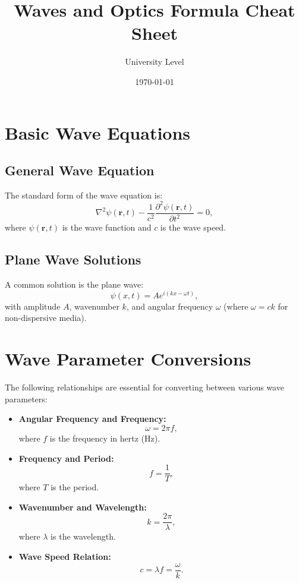 \documentclass[11pt]{article}
\title{Waves and Optics Formula Cheat Sheet}
\author{University Level}
\date{\today}
\begin{document}
\maketitle
\tableofcontents
\newpage

\section{Basic Wave Equations}
\subsection{General Wave Equation}
The standard form of the wave equation is:
\begin{equation}
    \nabla^2 \psi(\mathbf{r}, t) - \frac{1}{c^2} \frac{\partial^2 \psi(\mathbf{r}, t)}{\partial t^2} = 0,
\end{equation}
where \(\psi(\mathbf{r}, t)\) is the wave function and \(c\) is the wave speed.

\subsection{Plane Wave Solutions}
A common solution is the plane wave:
\begin{equation}
    \psi(x,t) = A e^{i(kx - \omega t)},
\end{equation}
with amplitude \(A\), wavenumber \(k\), and angular frequency \(\omega\) (where \( \omega = c k \) for non-dispersive media).

\section{Wave Parameter Conversions}
The following relationships are essential for converting between various wave parameters:
\begin{itemize}[leftmargin=*, label={--}]
    \item \textbf{Angular Frequency and Frequency:}
    \begin{equation}
        \omega = 2\pi f,
    \end{equation}
    where \(f\) is the frequency in hertz (Hz).
    
    \item \textbf{Frequency and Period:}
    \begin{equation}
        f = \frac{1}{T},
    \end{equation}
    where \(T\) is the period.
    
    \item \textbf{Wavenumber and Wavelength:}
    \begin{equation}
        k = \frac{2\pi}{\lambda},
    \end{equation}
    where \(\lambda\) is the wavelength.
    
    \item \textbf{Wave Speed Relation:}
    \begin{equation}
        c = \lambda f = \frac{\omega}{k}.
    \end{equation}
\end{itemize}
\end{document}
